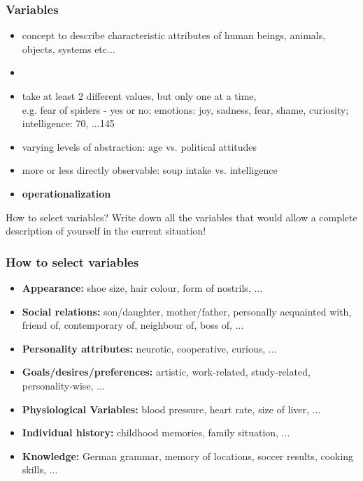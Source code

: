 \documentclass[]{beamer}
\begin{document}
\begin{frame}
\frametitle{Variables}
\begin{itemize}
 \item concept to describe characteristic attributes of human beings, animals, objects, systems etc...
 \item[]
 \item <2-> take at least 2 different values, but only one at a time, \\ 
e.g. fear of spiders - yes or no; emotions: joy, sadness, fear, shame, curiosity; intelligence: 70, ...145
 \item<2-> varying levels of abstraction: age vs. political attitudes
 \item<2-> more or less directly observable: soup intake vs. intelligence
 \item<2->[$\rightarrow$] \textbf{operationalization}
\end{itemize}
\end{frame}


\begin{frame}
 
\begin{exampleblock}{How to select variables?}
Write down all the variables that would allow a complete description of yourself in the current situation! 
\end{exampleblock}
\end{frame}

\begin{frame}
 \frametitle{How to select variables}
\begin{itemize}[<+->]
 \item []\textbf{Appearance:} shoe size, hair colour, form of nostrils, ...
 \item []\textbf{Social relations:} son/daughter, mother/father, personally
acquainted with, friend of, contemporary of, neighbour of, boss of, ...
 \item []\textbf{Personality attributes:} neurotic, cooperative, curious, ...
 \item []\textbf{Goals/desires/preferences:} artistic, work-related,
study-related, personality-wise, ...
 \item []\textbf{Physiological Variables:} blood pressure, heart rate, size of
liver, ...
 \item []\textbf{Individual history:} childhood memories, family situation, ...
 \item []\textbf{Knowledge:} German grammar, memory of locations, soccer
results,
cooking skills, ...
\end{itemize}
\end{frame}
\end{document}
